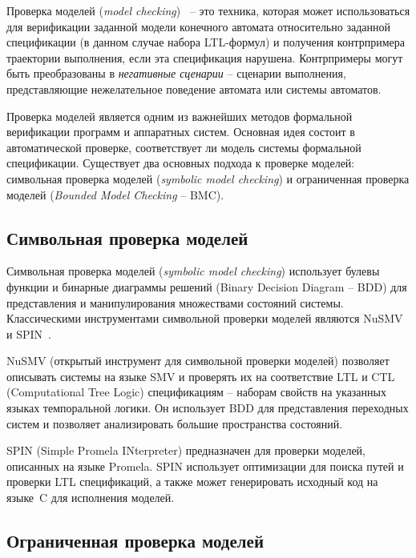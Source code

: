 Проверка моделей (\textit{model checking})~\cite{clarke1999} \--- это техника, которая может использоваться для верификации заданной модели конечного автомата относительно заданной спецификации (в данном случае набора LTL-формул) и получения контрпримера траектории выполнения, если эта спецификация нарушена.
Контрпримеры могут быть преобразованы в \textit{негативные сценарии} \--- сценарии выполнения, представляющие нежелательное поведение автомата или системы автоматов.

Проверка моделей является одним из важнейших методов формальной верификации программ и аппаратных систем.
Основная идея состоит в автоматической проверке, соответствует ли модель системы формальной спецификации.
Существует два основных подхода к проверке моделей: символьная проверка моделей (\textit{symbolic model checking}) и ограниченная проверка моделей (\textit{Bounded Model Checking} \--- BMC).


\subsection{Символьная проверка моделей}

Символьная проверка моделей (\textit{symbolic model checking}) использует булевы функции и бинарные диаграммы решений (Binary Decision Diagram \--- BDD) для представления и манипулирования множествами состояний системы.
Классическими инструментами символьной проверки моделей являются NuSMV~\cite{nusmv} и SPIN~\cite{holzmann1997}.

NuSMV (открытый инструмент для символьной проверки моделей) позволяет описывать системы на языке SMV и проверять их на соответствие LTL и CTL (Computational Tree Logic) спецификациям \--- наборам свойств на указанных языках темпоральной логики.
Он использует BDD для представления переходных систем и позволяет анализировать большие пространства состояний.

SPIN (Simple Promela INterpreter) предназначен для проверки моделей, описанных на языке Promela.
SPIN использует оптимизации для поиска путей и проверки LTL спецификаций, а также может генерировать исходный код на языке~C для исполнения моделей.


\subsection{Ограниченная проверка моделей}

